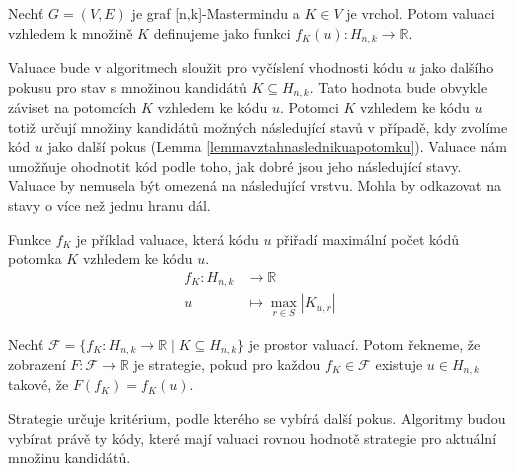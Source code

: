 



\begin{definice}[Valuace]
    Nechť $G = (V,E)$ je graf [n,k]-Mastermindu a $K \in V$ je vrchol. Potom valuaci vzhledem k množině $K$ definujeme jako funkci $f_K(u) \colon H_{n,k} \to \mathbb{R}$.
\end{definice}


Valuace bude v algoritmech sloužit pro vyčíslení vhodnosti kódu $u$ jako dalšího pokusu pro stav s množinou kandidátů $K\subseteq H_{n,k}$. Tato hodnota bude obvykle záviset na potomcích $K$ vzhledem ke kódu $u$. Potomci $K$ vzhledem ke kódu $u$ totiž určují množiny kandidátů možných následující stavů v případě, kdy zvolíme kód $u$ jako další pokus (Lemma \ref{lemmavztahnaslednikuapotomku}). Valuace nám umožňuje ohodnotit kód podle toho, jak dobré jsou jeho následující stavy. Valuace by nemusela být omezená na následující vrstvu. Mohla by odkazovat na stavy o více než jednu hranu dál.

\begin{prikl}\label{prjednokrokfce}
    Funkce $f_K$ je příklad valuace, která kódu $u$ přiřadí maximální počet kódů potomka $K$ vzhledem ke kódu $u$.
    \begin{align*}
        f_K \colon H_{n,k} &\to \mathbb{R} \\
        u &\mapsto \max_{r\in S} |K_{u,r}|
    \end{align*}
\end{prikl}


\begin{definice}[Strategie]
    Nechť $\mathcal{F} = \{f_K\colon H_{n,k} \to \mathbb{R} \mid K \subseteq H_{n,k}\}$ je prostor valuací. Potom řekneme, že zobrazení $F \colon \mathcal{F} \to \mathbb{R}$ je strategie, pokud pro každou $f_K \in \mathcal{F}$ existuje $u\in H_{n,k}$ takové, že $F(f_K) = f_K(u)$.
\end{definice}
Strategie určuje kritérium, podle kterého se vybírá další pokus. Algoritmy budou vybírat právě ty kódy, které mají valuaci rovnou hodnotě strategie pro aktuální množinu kandidátů. 

